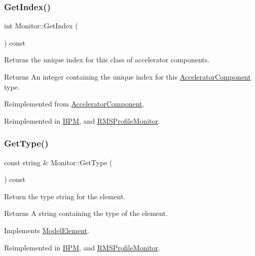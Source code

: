 \subsubsection{\texorpdfstring{Get\+Index()}{GetIndex()}}
{\footnotesize\ttfamily int Monitor\+::\+Get\+Index (\begin{DoxyParamCaption}{ }\end{DoxyParamCaption}) const\hspace{0.3cm}{\ttfamily [virtual]}}

Returns the unique index for this class of accelerator components. \begin{DoxyReturn}{Returns}
An integer containing the unique index for this \hyperlink{classAcceleratorComponent}{Accelerator\+Component} type. 
\end{DoxyReturn}


Reimplemented from \hyperlink{classAcceleratorComponent_abd1490171ac9af6004d3da01fb3b95fb}{Accelerator\+Component}.



Reimplemented in \hyperlink{classBPM_acaf99f021f92252962f2fbcbc24a2679}{B\+PM}, and \hyperlink{classRMSProfileMonitor_a87a98fa994d96c393a91500320242942}{R\+M\+S\+Profile\+Monitor}.

\mbox{\label{classMonitor_a8408f173bef0f0c0dd89b6624c84f66b}} 
\subsubsection{\texorpdfstring{Get\+Type()}{GetType()}}
{\footnotesize\ttfamily const string \& Monitor\+::\+Get\+Type (\begin{DoxyParamCaption}{ }\end{DoxyParamCaption}) const\hspace{0.3cm}{\ttfamily [virtual]}}

Return the type string for the element. \begin{DoxyReturn}{Returns}
A string containing the type of the element. 
\end{DoxyReturn}


Implements \hyperlink{classModelElement_a04dc2e51e1999fca612eb1838ec6b271}{Model\+Element}.



Reimplemented in \hyperlink{classBPM_a1fbab5ffd976674ed24ef5833caaf7ee}{B\+PM}, and \hyperlink{classRMSProfileMonitor_ab97d742126deccadd878c402291a6263}{R\+M\+S\+Profile\+Monitor}.

